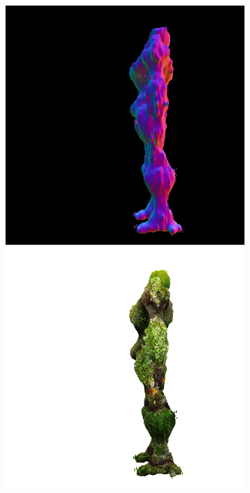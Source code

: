 \begin{figure}[ht]
\begin{subfigure}[b]{0.222\textwidth}
        \includegraphics[width=\textwidth]{figures/appendix/magic123_refine_robot_left_5000_part2.png}
        \includegraphics[width=\textwidth]{figures/appendix/magic123_refine_robot_left_5000_part1.png}

\end{subfigure}
\end{figure}
